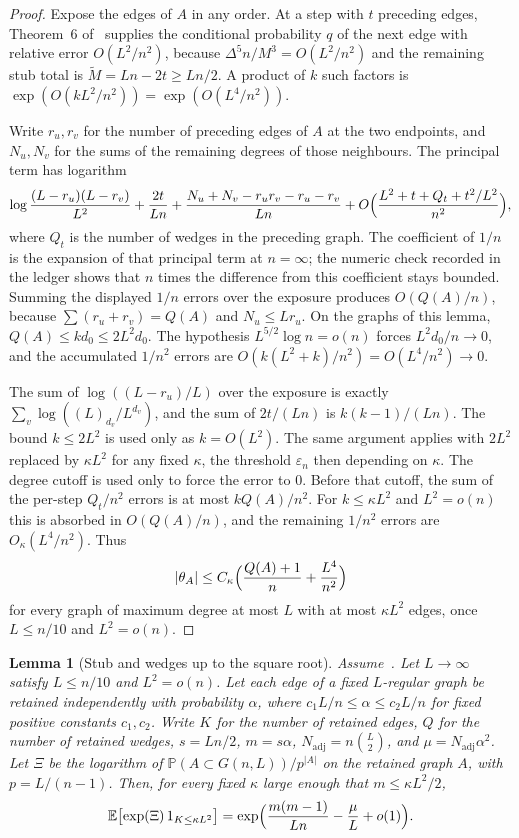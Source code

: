 \documentclass[11pt]{article}
\newtheorem{lemma}[theorem]{Lemma}
\newcommand{\EE}{\mathbb{E}}
\newcommand{\PP}{\mathbb{P}}
\begin{document}
\begin{proof}
Expose the edges of \(A\) in any order. At a step with \(t\) preceding edges,
Theorem~6 of~\cite{Gao20} supplies the conditional probability \(q\) of the
next edge with relative error \(O(L^2/n^2)\), because
\(\Delta^5 n/M^3=O(L^2/n^2)\) and the remaining stub total is
\(\widetilde M=Ln-2t\ge Ln/2\).
A product of \(k\) such factors is \(\exp(O(k L^2/n^2))=\exp(O(L^4/n^2))\).

Write \(r_u,r_v\) for the number of preceding edges of \(A\) at the two
endpoints, and \(N_u,N_v\) for the sums of the remaining degrees of those
neighbours. The principal term has logarithm
\[
\log\frac{(L-r_u)(L-r_v)}{L^2}+\frac{2t}{Ln}
+\frac{N_u+N_v-r_ur_v-r_u-r_v}{Ln}+O\Bigl(\frac{L^2+t+Q_t+t^2/L^2}{n^2}\Bigr),
\]
where \(Q_t\) is the number of wedges in the preceding graph. The coefficient
of \(1/n\) is the expansion of that principal term at \(n=\infty\); the numeric
check recorded in the ledger shows that \(n\) times the difference from this
coefficient stays bounded. Summing the displayed \(1/n\) errors over the
exposure produces \(O(Q(A)/n)\), because
\(\sum(r_u+r_v)=Q(A)\) and \(N_u\le L r_u\).
On the graphs of this lemma, \(Q(A)\le kd_0\le 2L^2 d_0\). The hypothesis
\(L^{5/2}\log n=o(n)\) forces \(L^2 d_0/n\to 0\), and the accumulated \(1/n^2\) errors are
\(O(k(L^2+k)/n^2)=O(L^4/n^2)\to 0\).

The sum of \(\log((L-r_u)/L)\) over the exposure is exactly
\(\sum_v\log((L)_{d_v}/L^{d_v})\), and the sum of \(2t/(Ln)\) is
\(k(k-1)/(Ln)\).
The bound \(k\le 2L^2\) is used only as \(k=O(L^2)\). The same argument
applies with \(2L^2\) replaced by \(\kappa L^2\) for any fixed \(\kappa\),
the threshold \(\varepsilon_n\) then depending on \(\kappa\).
The degree cutoff is used only to force the error to \(0\). Before that
cutoff, the sum of the per-step \(Q_t/n^2\) errors is at most \(kQ(A)/n^2\).
For \(k\le\kappa L^2\) and \(L^2=o(n)\) this is absorbed in \(O(Q(A)/n)\), and
the remaining \(1/n^2\) errors are \(O_\kappa(L^4/n^2)\). Thus
\[
|\theta_A|
\le
C_\kappa\Bigl(\frac{Q(A)+1}{n}+\frac{L^4}{n^2}\Bigr)
\]
for every graph of maximum degree at most \(L\) with at most \(\kappa L^2\)
edges, once \(L\le n/10\) and \(L^2=o(n)\).
\end{proof}

\begin{lemma}[Stub and wedges up to the square root]
\label{lem:stub-wedge}
Assume~\cite[Theorem~6]{Gao20}. Let \(L\to\infty\) satisfy \(L\le n/10\) and
\(L^2=o(n)\). Let each edge of a fixed \(L\)-regular graph be
retained independently with probability \(\alpha\), where
\(c_1 L/n\le\alpha\le c_2 L/n\) for fixed positive constants \(c_1,c_2\).
Write \(K\) for the number of retained edges, \(Q\) for the number of retained
wedges, \(s=Ln/2\), \(m=s\alpha\), \(N_{\mathrm{adj}}=n\binom{L}{2}\), and
\(\mu=N_{\mathrm{adj}}\alpha^2\). Let \(\Xi\) be the logarithm of
\(\PP(A\subset G(n,L))/p^{|A|}\) on the retained graph \(A\), with
\(p=L/(n-1)\). Then, for every fixed \(\kappa\) large enough that
\(m\le\kappa L^2/2\),
\[
\EE\bigl[\exp(\Xi)\,1_{K\le\kappa L^2}\bigr]
=
\exp\Bigl(\frac{m(m-1)}{Ln}-\frac{\mu}{L}+o(1)\Bigr).
\]
\end{lemma}
\end{document}
